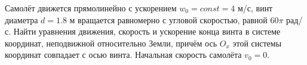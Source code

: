 Самолёт движется прямолинейно с ускорением $w_0 = const = 4$ м/с,
винт диаметра $d = 1.8$ м вращается равномерно с угловой скоростью,
равной $60\pi$ рад/с.
Найти уравнения движения, скорость и ускорение конца винта в системе координат,
неподвижной относительно Земли, причём ось $O_x$ этой системы координат
совпадает с осью винта.
Начальная скорость самолёта $v_0 = 0$.
